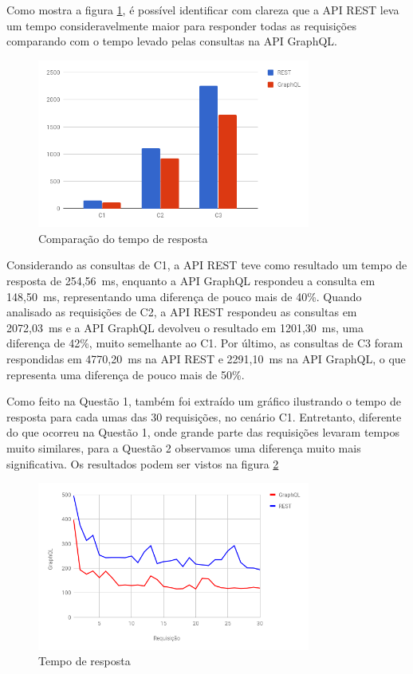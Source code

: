 Como mostra a figura \ref{fig:q2-time}, é possível identificar com clareza que a API REST leva um tempo consideravelmente maior para responder todas as requisições comparando com o tempo levado pelas consultas na API GraphQL.

\begin{figure}[htbp]
    \centering
    \includegraphics[width=0.8\textwidth]{figuras/q1-time.png}
    \caption{Comparação do tempo de resposta}
    \label{fig:q2-time}
    \author{fonte: Autor}
\end{figure}

Considerando as consultas de C1, a API REST teve como resultado um tempo de resposta de 254,56~ms, enquanto a API GraphQL respondeu a consulta em 148,50~ms, representando uma diferença de pouco mais de 40\%. Quando analisado as requisições de C2, a API REST respondeu as consultas em 2072,03~ms e a API GraphQL devolveu o resultado em 1201,30~ms, uma diferença de 42\%, muito semelhante ao C1. Por último, as consultas de C3 foram respondidas em 4770,20~ms na API REST e 2291,10~ms na API GraphQL, o que representa uma diferença de pouco mais de 50\%.

Como feito na Questão 1, também foi extraído um gráfico ilustrando o tempo de resposta para cada umas das 30 requisições, no cenário C1. Entretanto, diferente do que ocorreu na Questão 1, onde grande parte das requisições levaram tempos muito similares, para a Questão 2 observamos uma diferença muito mais significativa. Os resultados podem ser vistos na figura \ref{fig:q2-time-line}

\begin{figure}[htbp]
    \centering
    \includegraphics[width=0.8\textwidth]{figuras/q2-time-line.png}
    \caption{Tempo de resposta}
    \label{fig:q2-time-line}
\end{figure}

